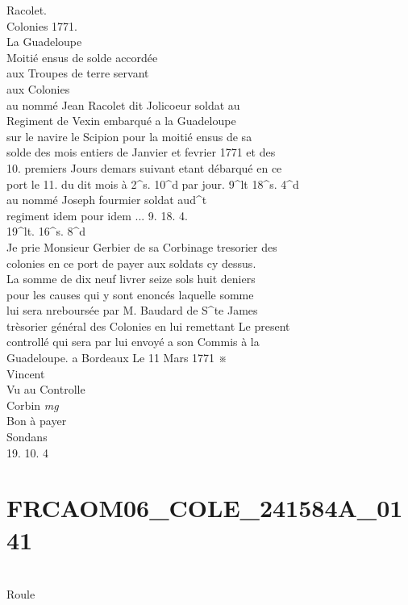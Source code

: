 \documentclass{article}
\begin{document}
\begin{pages}
Racolet.\\
Colonies 1771.\\
La Guadeloupe\\
Moitié ensus de solde accordée\\
aux Troupes de terre servant\\
aux Colonies\\
au nommé Jean Racolet dit Jolicoeur soldat au\\
Regiment de Vexin embarqué a la Guadeloupe\\
sur le navire le Scipion pour la moitié ensus de sa\\
solde des mois entiers de Janvier et fevrier 1771 et des\\
10. premiers Jours demars suivant etant débarqué en ce\\
port le 11. du dit mois à 2\^{}s. 10\^{}d par jour. 9\^{}lt 18\^{}s. 4\^{}d\\
au nommé Joseph fourmier soldat aud\^{}t\\
regiment idem pour idem ... 9. 18. 4.\\
19\^{}lt. 16\^{}s. 8\^{}d\\
Je prie Monsieur Gerbier de sa Corbinage tresorier des\\
colonies en ce port de payer aux soldats cy dessus.\\
La somme de dix neuf livrer seize sols huit deniers\\
pour les causes qui y sont enoncés laquelle somme\\
lui sera nreboursée par M. Baudard de S\^{}te James\\
trèsorier général des Colonies en lui remettant Le present\\
controllé qui sera par lui envoyé a son Commis à la\\
Guadeloupe. a Bordeaux Le 11 Mars 1771 ※\\
Vincent\\
Vu au Controlle\\
Corbin
\pend
\vspace{0.5cm}\noindent
\textit{mg}
\footnotesize \\
Bon à payer\\
Sondans\\
19. 10. 4
\normalsize 
\endnumbering\beginnumbering\section{FRCAOM06\_COLE\_241584A\_0141}\pstart
\\
Roule\\

\end{pages}
\end{document}
